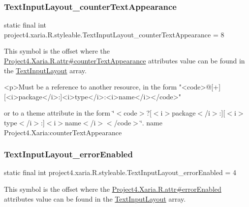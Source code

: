 \subsubsection{\texorpdfstring{Text\+Input\+Layout\+\_\+counter\+Text\+Appearance}{TextInputLayout\_counterTextAppearance}}
{\footnotesize\ttfamily static final int project4.\+xaria.\+R.\+styleable.\+Text\+Input\+Layout\+\_\+counter\+Text\+Appearance = 8\hspace{0.3cm}{\ttfamily [static]}}

This symbol is the offset where the \hyperlink{}{Project4.\+Xaria.\+R.\+attr\#counter\+Text\+Appearance} attribute\textquotesingle{}s value can be found in the \hyperlink{classproject4_1_1xaria_1_1R_1_1styleable_a5a2e4611c17d75c805194b416b9fed74}{Text\+Input\+Layout} array.

\begin{DoxyVerb}      <p>Must be a reference to another resource, in the form "<code>@[+][<i>package</i>:]<i>type</i>:<i>name</i></code>"
\end{DoxyVerb}
 or to a theme attribute in the form \char`\"{}$<$code$>$?\mbox{[}$<$i$>$package$<$/i$>$\+:\mbox{]}\mbox{[}$<$i$>$type$<$/i$>$\+:\mbox{]}$<$i$>$name$<$/i$>$$<$/code$>$\char`\"{}.  name Project4.\+Xaria\+:counter\+Text\+Appearance \mbox{\label{classproject4_1_1xaria_1_1R_1_1styleable_aa75e51a42b96d39550dcd078cc70a0d7}} 
\subsubsection{\texorpdfstring{Text\+Input\+Layout\+\_\+error\+Enabled}{TextInputLayout\_errorEnabled}}
{\footnotesize\ttfamily static final int project4.\+xaria.\+R.\+styleable.\+Text\+Input\+Layout\+\_\+error\+Enabled = 4\hspace{0.3cm}{\ttfamily [static]}}

This symbol is the offset where the \hyperlink{}{Project4.\+Xaria.\+R.\+attr\#error\+Enabled} attribute\textquotesingle{}s value can be found in the \hyperlink{classproject4_1_1xaria_1_1R_1_1styleable_a5a2e4611c17d75c805194b416b9fed74}{Text\+Input\+Layout} array.


